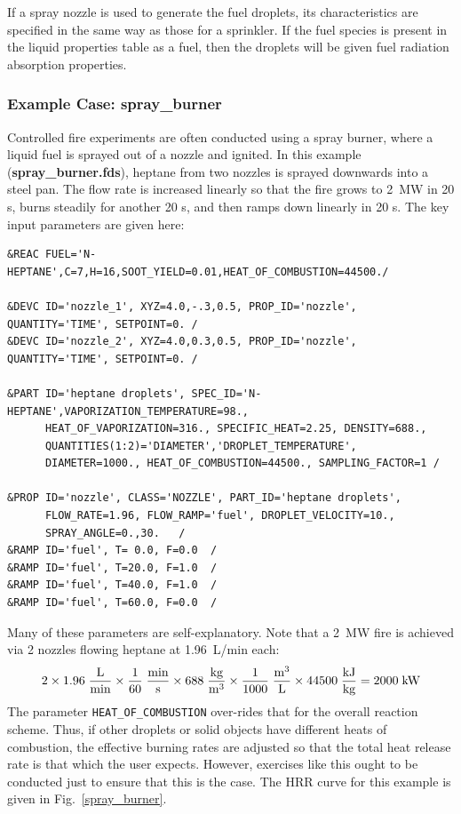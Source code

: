 \documentclass[11pt]{book}
\newcommand{\ct}{\tt\small}
\newcommand{\be}{\begin{equation}}
\newcommand{\ee}{\end{equation}}
\begin{document}
If a spray nozzle is used to generate the fuel droplets, its characteristics are specified
in the same way as those for a sprinkler.  If the fuel species is present in the liquid properties table as a fuel, then the droplets will be given fuel radiation absorption properties.

\subsubsection{Example Case: spray\_burner}

Controlled fire experiments are often conducted using a spray burner,
where a liquid fuel is sprayed out of a nozzle and ignited. In this
example ({\bf spray\_burner.fds}), heptane from two nozzles is
sprayed downwards into a steel pan.  The flow rate is increased
linearly so that the fire grows to 2~MW in 20 s, burns steadily for
another 20 s, and then ramps down linearly in 20 s. The key input
parameters are given here:

\footnotesize
\begin{verbatim}
&REAC FUEL='N-HEPTANE',C=7,H=16,SOOT_YIELD=0.01,HEAT_OF_COMBUSTION=44500./

&DEVC ID='nozzle_1', XYZ=4.0,-.3,0.5, PROP_ID='nozzle', QUANTITY='TIME', SETPOINT=0. /
&DEVC ID='nozzle_2', XYZ=4.0,0.3,0.5, PROP_ID='nozzle', QUANTITY='TIME', SETPOINT=0. /

&PART ID='heptane droplets', SPEC_ID='N-HEPTANE',VAPORIZATION_TEMPERATURE=98.,
      HEAT_OF_VAPORIZATION=316., SPECIFIC_HEAT=2.25, DENSITY=688.,
      QUANTITIES(1:2)='DIAMETER','DROPLET_TEMPERATURE',
      DIAMETER=1000., HEAT_OF_COMBUSTION=44500., SAMPLING_FACTOR=1 /

&PROP ID='nozzle', CLASS='NOZZLE', PART_ID='heptane droplets',
      FLOW_RATE=1.96, FLOW_RAMP='fuel', DROPLET_VELOCITY=10.,
      SPRAY_ANGLE=0.,30.   /
&RAMP ID='fuel', T= 0.0, F=0.0  /
&RAMP ID='fuel', T=20.0, F=1.0  /
&RAMP ID='fuel', T=40.0, F=1.0  /
&RAMP ID='fuel', T=60.0, F=0.0  /
\end{verbatim}
\normalsize

\noindent
Many of these parameters are self-explanatory. Note that a 2~MW fire is achieved via 2 nozzles flowing heptane at 1.96~L/min each:
\be 2 \times 1.96 \; \frac{\hbox{L}}{\hbox{min}} \times \frac{1}{60} \; \frac{\hbox{min}}{\hbox{s}} \times 688 \;
\frac{\hbox{kg}}{\hbox{m}^3} \times \frac{1}{1000} \; \frac{\hbox{m}^3}{\hbox{L}} \times 44500 \;
\frac{\hbox{kJ}}{\hbox{kg}} = 2000 \; \hbox{kW} \ee
The parameter {\ct HEAT\_OF\_COMBUSTION} over-rides that for the overall
reaction scheme. Thus, if other droplets or solid objects have different
heats of combustion, the effective burning rates are adjusted so that the
total heat release rate is that which the user expects. However, exercises
like this ought to be conducted just to ensure that this is the case.
The HRR curve for this example is given in Fig.~\ref{spray_burner}.
\end{document}
